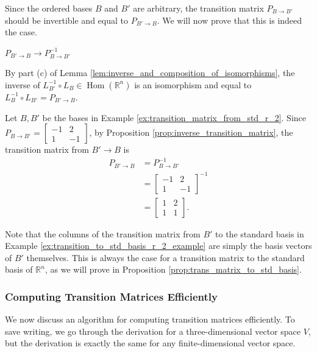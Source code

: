 \documentclass[12pt,letterpaper,reqno]{article}
\numberwithin{equation}{section}
\newcommand{\R}{\ensuremath{\mathbb R}}
\DeclareMathOperator{\Hom}{Hom}
\begin{document}
Since the ordered bases $B$ and $B'$ are arbitrary, the transition matrix $P_{B \to B'}$ should be invertible and equal to $P_{B' \to B}$. We will now prove that this is indeed the case.

\begin{prop}[$P_{B' \to B} \to P_{B \to B'}^{-1}$]\label{prop:inverse_transition_matrix}
	$P_{B' \to B} \to P_{B \to B'}^{-1}$
\end{prop}

\begin{pf}
By part (c) of Lemma \ref{lem:inverse_and_composition_of_isomorphisms}, the inverse of $L_{B'}^{-1} \circ L_B \in \Hom(\R^n)$ is an isomorphism and equal to $L_B^{-1} \circ L_{B'}=P_{B' \to B}$.	
\end{pf}

\begin{example}\label{ex:transition_to_std_basis_r_2_example}
Let $B,B'$ be the bases in Example \ref{ex:transition_matrix_from_std_r_2}. Since $P_{B \to B'}=\begin{bmatrix}
	-1 & 2 \\ 
	1 & -1
\end{bmatrix}$, by Proposition \ref{prop:inverse_transition_matrix}, the transition matrix from $B' \to B$ is
\begin{align*}
	P_{B' \to B}&=P_{B \to B'}^{-1} \\
	&=\begin{bmatrix}
		-1 & 2 \\ 
	1 & -1
	\end{bmatrix}^{-1} \\
	&=\begin{bmatrix}
		1 & 2 \\
		1 & 1
	\end{bmatrix}.
\end{align*}	
\end{example}
Note that the columns of the transition matrix from $B'$ to the standard basis in Example \ref{ex:transition_to_std_basis_r_2_example} are simply the basis vectors of $B'$ themselves. This is always the case for a transition matrix to the standard basis of $\R^n$, as we will prove in Proposition \ref{prop:trans_matrix_to_std_basis}.

\subsubsection{Computing Transition Matrices Efficiently}
We now discuss an algorithm for computing transition matrices efficiently. To save writing, we go through the derivation for a three-dimensional vector space $V$, but the derivation is exactly the same for any finite-dimensional vector space. 
\end{document}
